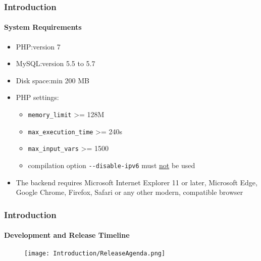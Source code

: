 \begin{frame}[fragile]
	\frametitle{Introduction}
	\framesubtitle{System Requirements}

	\begin{itemize}
		\item PHP:\tabto{2.2cm}version 7
		\item MySQL:\tabto{2.2cm}version 5.5 to 5.7
		\item Disk space:\tabto{2.2cm}min 200 MB
		\item PHP settings:

			\begin{itemize}
				\item \texttt{memory\_limit} >= 128M
				\item \texttt{max\_execution\_time} >= 240s
				\item \texttt{max\_input\_vars} >= 1500
				\item compilation option \texttt{-}\texttt{-disable-ipv6} must \underline{not} be used
			\end{itemize}

		\item The backend requires Microsoft Internet Explorer 11 or later,
			Microsoft Edge, Google Chrome, Firefox, Safari or any other modern,
			compatible browser

	\end{itemize}

\end{frame}

\begin{frame}[fragile]
	\frametitle{Introduction}
	\framesubtitle{Development and Release Timeline}

	\begin{figure}
		\texttt{[image: Introduction/ReleaseAgenda.png]}
	\end{figure}

\end{frame}

